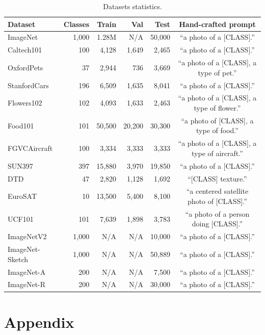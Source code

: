 \begin{table}[t]
    \tabstyle{6pt}
    \caption{Datasets statistics.}
    \label{tab:datasets}
    \begin{tabular}{l r r r r c}
    \toprule
    Dataset & Classes & Train & Val & Test & Hand-crafted prompt \\
    \midrule
    ImageNet & 1,000 & 1.28M & N/A & 50,000 & ``a photo of a [CLASS].'' \\
    Caltech101 & 100 & 4,128 & 1,649 & 2,465 & ``a photo of a [CLASS].'' \\ %
    OxfordPets & 37 & 2,944 & 736 & 3,669 & ``a photo of a [CLASS], a type of pet.'' \\
    StanfordCars & 196 & 6,509 & 1,635 & 8,041 & ``a photo of a [CLASS].'' \\
    Flowers102 & 102 & 4,093 & 1,633 & 2,463 & ``a photo of a [CLASS], a type of flower.'' \\
    Food101 & 101 & 50,500 & 20,200 & 30,300 & ``a photo of [CLASS], a type of food.'' \\
    FGVCAircraft & 100 & 3,334 & 3,333 & 3,333 & ``a photo of a [CLASS], a type of aircraft.'' \\
    SUN397 & 397 & 15,880 & 3,970 & 19,850 & ``a photo of a [CLASS].'' \\
    DTD & 47 & 2,820 & 1,128 & 1,692 & ``[CLASS] texture.'' \\
    EuroSAT & 10 & 13,500 & 5,400 & 8,100 & ``a centered satellite photo of [CLASS].'' \\
    UCF101 & 101 & 7,639 & 1,898 & 3,783 & ``a photo of a person doing [CLASS].'' \\
    \midrule
    ImageNetV2 & 1,000 & N/A & N/A & 10,000 & ``a photo of a [CLASS].'' \\
    ImageNet-Sketch & 1,000 & N/A & N/A & 50,889 & ``a photo of a [CLASS].'' \\
    ImageNet-A & 200 & N/A & N/A & 7,500 & ``a photo of a [CLASS].'' \\
    ImageNet-R & 200 & N/A & N/A & 30,000 & ``a photo of a [CLASS].'' \\
    \bottomrule
    \end{tabular}
\end{table}

\appendix
\section*{Appendix}

